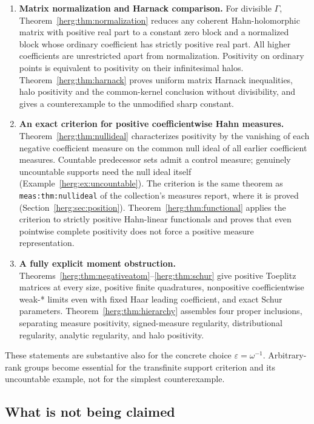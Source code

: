 \documentclass[11pt,letterpaper]{article}
\theoremstyle{definition}
\newcommand{\eps}{\varepsilon}
\numberwithin{equation}{section}
\begin{document}
\begin{enumerate}[label=\textbf{\arabic*.}]
\item \textbf{Matrix normalization and Harnack comparison.}
For divisible $\Gamma$, Theorem~\ref{herg:thm:normalization} reduces any coherent Hahn-holomorphic matrix with positive real part to a constant zero block and a normalized block whose ordinary coefficient has strictly positive real part. All higher coefficients are unrestricted apart from normalization. Positivity on ordinary points is equivalent to positivity on their infinitesimal halos. Theorem~\ref{herg:thm:harnack} proves uniform matrix Harnack inequalities, halo positivity and the common-kernel conclusion without divisibility, and gives a counterexample to the unmodified sharp constant.
\item \textbf{An exact criterion for positive coefficientwise Hahn measures.}
Theorem~\ref{herg:thm:nullideal} characterizes positivity by the vanishing of each negative coefficient measure on the common null ideal of all earlier coefficient measures. Countable predecessor sets admit a control measure; genuinely uncountable supports need the null ideal itself (Example~\ref{herg:ex:uncountable}). The criterion is the same theorem as \texttt{meas:thm:nullideal} of the collection's measures report, where it is proved (Section~\ref{herg:sec:position}). Theorem~\ref{herg:thm:functional} applies the criterion to strictly positive Hahn-linear functionals and proves that even pointwise complete positivity does not force a positive measure representation.
\item \textbf{A fully explicit moment obstruction.}
Theorems~\ref{herg:thm:negativeatom}--\ref{herg:thm:schur} give positive Toeplitz matrices at every size, positive finite quadratures, nonpositive coefficientwise weak-* limits even with fixed Haar leading coefficient, and exact Schur parameters. Theorem~\ref{herg:thm:hierarchy} assembles four proper inclusions, separating measure positivity, signed-measure regularity, distributional regularity, analytic regularity, and halo positivity.
\end{enumerate}

These statements are substantive also for the concrete choice $\eps=\omega^{-1}$. Arbitrary-rank groups become essential for the transfinite support criterion and its uncountable example, not for the simplest counterexample.

\subsection{What is not being claimed}
\end{document}
